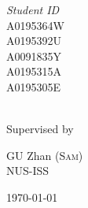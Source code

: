 \begin{titlepage}
\begin{center}
\begin{minipage}{0.2\textwidth}
			\begin{flushright} \large
			\emph{Student ID} \\
            A0195364W\\
            A0195392U\\
            A0091835Y\\
            A0195315A\\
            A0195305E\\
		\end{flushright}

	\end{minipage}\\

\vspace{1cm}
Supervised by\par
GU Zhan (\textsc{Sam}) \\
NUS-ISS\par
\vspace{1.5cm}
\large
\today

\end{center}

\clearpage
\restoregeometry
\end{titlepage}
